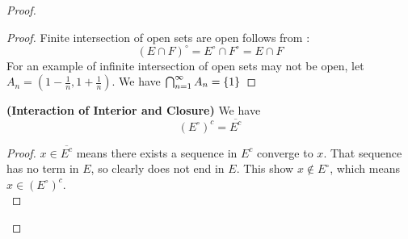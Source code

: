 \documentclass{report}
\begin{document}
\begin{proof}
\begin{proof}
Finite intersection of open sets are open follows from :
\begin{equation}
  (E\cap F)^\circ =E^\circ \cap F^\circ =E\cap F
\end{equation}
For an example of infinite intersection of open sets may not be open, let $A_n=(1-\frac{1}{n},1+\frac{1}{n})$. We have $\bigcap_{n=1}^\infty A_n=\{ 1 \}$
\end{proof}
\begin{theorem}
\label{1.3.6}
\textbf{(Interaction of Interior and Closure)} We have
\begin{equation}
  (E^\circ )^c=\overline{E^c}
\end{equation}
\end{theorem}
\begin{proof}
$x\in \overline{E^c}$ means there exists a sequence in $E^c$ converge to  $x$. That sequence has no term in $E$, so clearly does not end in  $E$. This show  $x\not \in E^\circ $, which means $x\in (E^\circ )^c$.\\


\end{proof}
\end{proof}
\end{document}
